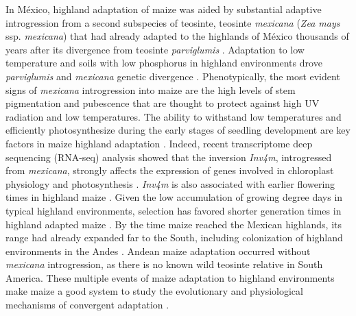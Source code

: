 \documentclass[9pt,twocolumn,twoside,lineno]{BioRxiv}
\begin{document}
In México, highland adaptation of maize was aided by substantial adaptive introgression from a second subspecies of teosinte, teosinte \textit{mexicana} (\textit{Zea mays} ssp. \textit{mexicana}) that had already adapted to the highlands of México thousands of years after its divergence from teosinte \textit{parviglumis} \cite{Hufford2013-gs, Gonzalez-Segovia2019-jy}. 
Adaptation to low temperature and soils with low phosphorus in highland environments drove \textit{parviglumis} and \textit{mexicana} genetic divergence \cite{AguirreLiguori2019-fl}.
Phenotypically, the most evident signs of \textit{mexicana} introgression into maize are the high levels of stem pigmentation and pubescence \cite{Lauter2004-eq} that are thought to protect against high UV radiation and low temperatures. 
The ability to withstand low temperatures and efficiently photosynthesize during the early stages of seedling development are key factors in maize highland adaptation \cite{Hardacre1980-tq}.
Indeed, recent transcriptome deep sequencing (RNA-seq) analysis showed that the inversion \textit{Inv4m}, introgressed from \textit{mexicana}, strongly affects the expression of genes involved in chloroplast physiology and photosynthesis \cite{Crow2020-gene}.  
\textit{Inv4m} is also associated with earlier flowering times in highland maize \cite{Romero_Navarro2017-cn, Gates2019-xu}. 
Given the low accumulation of growing degree days in typical highland environments, selection has favored shorter generation  times in highland adapted maize \cite{Gates2019-xu}.
By the time maize reached the Mexican highlands, its range had already expanded far to the South, including colonization of highland environments in the  Andes \cite{Athens2016-ep, Grobman2012-pm}. 
Andean maize adaptation occurred without \textit{mexicana} introgression, as there is no known wild teosinte relative in South America.
These multiple events of maize adaptation to highland environments make maize a good system to study the evolutionary and physiological mechanisms of convergent adaptation \cite{Takuno2015-uj, Wang2020-mp}.
\end{document}
